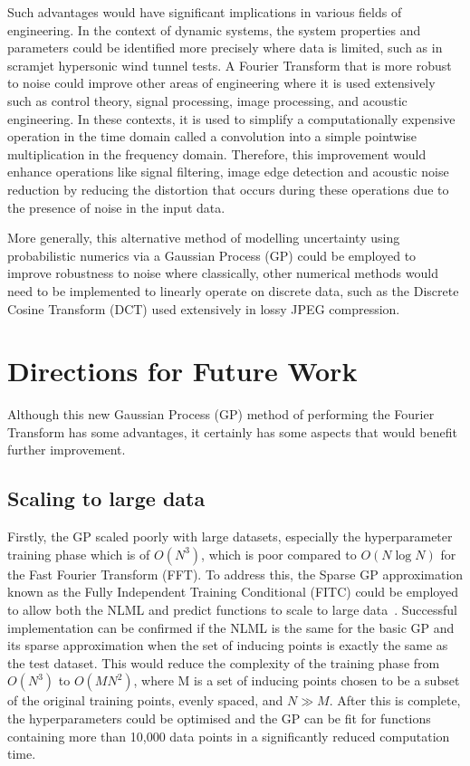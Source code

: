 \documentclass[12pt]{article}
\begin{document}
    Such advantages would have significant implications in various fields of engineering.
    In the context of dynamic systems, the system properties and parameters could be identified more precisely where data is limited, such as in scramjet hypersonic wind tunnel tests.
    A Fourier Transform that is more robust to noise could improve other areas of engineering where it is used extensively such as control theory, signal processing, image processing, and acoustic engineering.
    In these contexts, it is used to simplify a computationally expensive operation in the time domain called a convolution into a simple pointwise multiplication in the frequency domain.
    Therefore, this improvement would enhance operations like signal filtering, image edge detection and acoustic noise reduction by reducing the distortion that occurs during these operations due to the presence of noise in the input data.

    More generally, this alternative method of modelling uncertainty using probabilistic numerics via a Gaussian Process (GP) could be employed to improve robustness to noise where classically, other numerical methods would need to be implemented to linearly operate on discrete data, such as the Discrete Cosine Transform (DCT) used extensively in lossy JPEG compression.~\cite{StanfordJPEGDCT}


    \section{Directions for Future Work}
    Although this new Gaussian Process (GP) method of performing the Fourier Transform has some advantages, it certainly has some aspects that would benefit further improvement.

    \subsection{Scaling to large data}
    Firstly, the GP scaled poorly with large datasets, especially the hyperparameter training phase which is of $O(N^3)$, which is poor compared to $O(N \log{N})$ for the Fast Fourier Transform (FFT). To address this, the Sparse GP approximation known as the Fully Independent Training Conditional (FITC) could be employed to allow both the NLML and predict functions to scale to large data~\cite{q-candela}.
    Successful implementation can be confirmed if the NLML is the same for the basic GP and its sparse approximation when the set of inducing points is exactly the same as the test dataset.
    This would reduce the complexity of the training phase from $O(N^3)$ to $O(MN^2)$, where M is a set of inducing points chosen to be a subset of the original training points, evenly spaced, and $N \gg M$. 
    After this is complete, the hyperparameters could be optimised and the GP can be fit for functions containing more than 10,000 data points in a significantly reduced computation time.
\end{document}
